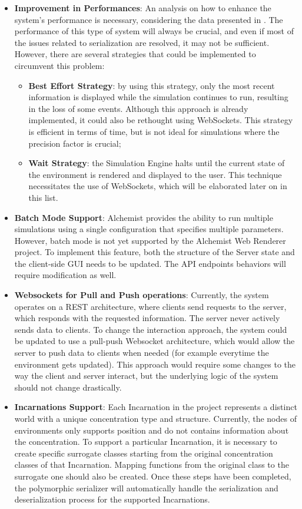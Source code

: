 \begin{itemize}
	\item \textbf{Improvement in Performances}: An analysis on how to enhance the system's performance is necessary, considering the data presented in . The performance of this type of system will always be crucial, and even if most of the issues related to serialization are resolved, it may not be sufficient. However, there are several strategies that could be implemented to circumvent this problem:
	\begin{itemize}
		\item \textbf{Best Effort Strategy}: by using this strategy, only the most recent information is displayed while the simulation continues to run, resulting in the loss of some events. Although this approach is already implemented, it could also be rethought using WebSockets. This strategy is efficient in terms of time, but is not ideal for simulations where the precision factor is crucial;
		\item \textbf{Wait Strategy}: the Simulation Engine halts until the current state of the environment is rendered and displayed to the user. This technique necessitates the use of WebSockets, which will be elaborated later on in this list.
	\end{itemize}
	\item \textbf{Batch Mode Support}: Alchemist provides the ability to run multiple simulations using a single configuration that specifies multiple parameters. However, batch mode is not yet supported by the Alchemist Web Renderer project. To implement this feature, both the structure of the Server state and the client-side GUI needs to be updated. The API endpoints behaviors will require modification as well.
	\item \textbf{Websockets for Pull and Push operations}: Currently, the system operates on a REST architecture, where clients send requests to the server, which responds with the requested information. The server never actively sends data to clients. To change the interaction approach, the system could be updated to use a pull-push Websocket architecture, which would allow the server to push data to clients when needed (for example everytime the environment gets updated). This approach would require some changes to the way the client and server interact, but the underlying logic of the system should not change drastically.
	\item \textbf{Incarnations Support}: Each Incarnation in the project represents a distinct world with a unique concentration type and structure. Currently, the nodes of environments only supports position and do not contains information about the concentration. To support a particular Incarnation, it is necessary to create specific surrogate classes starting from the original concentration classes of that Incarnation. Mapping functions from the original class to the surrogate one should also be created. Once these steps have been completed, the polymorphic serializer will automatically handle the serialization and deserialization process for the supported Incarnations.

\end{itemize}
